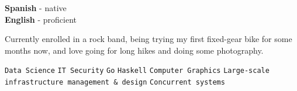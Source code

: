 \documentclass[9pt]{developercv}
\begin{document}
\begin{minipage}[t]{0.3\textwidth}
    \vspace{-\baselineskip}

    
    \textbf{Spanish} - native\\
    \textbf{English} - proficient
\end{minipage}
\hfill
\begin{minipage}[t]{0.3\textwidth}
    \vspace{-\baselineskip}
    
    
    Currently enrolled in a rock band, being trying my first fixed-gear bike for
    some months now, and love going for long hikes and
    doing some photography.
\end{minipage}
\hfill
\begin{minipage}[t]{0.3\textwidth}
    \vspace{-\baselineskip}


    \texttt{Data Science}\slashsep
    \texttt{IT Security}\slashsep
    \texttt{Go}\slashsep
    \texttt{Haskell}\slashsep
    \texttt{Computer Graphics}\slashsep
    \texttt{Large-scale infrastructure management \& design}\slashsep
    \texttt{Concurrent systems}
\end{minipage}

\end{document}
